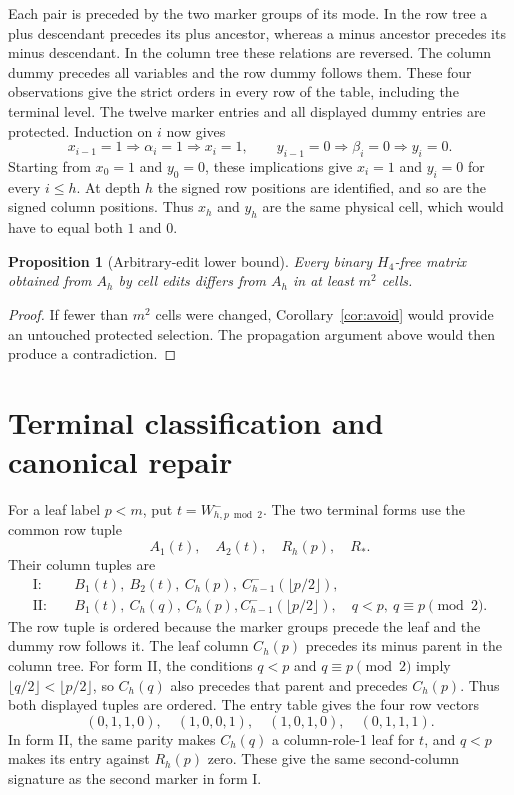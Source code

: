 \documentclass[11pt]{article}
\newtheorem{proposition}[theorem]{Proposition}
\begin{document}
Each pair is preceded by the two marker groups of its mode. In the row
tree a plus descendant precedes its plus ancestor, whereas a minus ancestor
precedes its minus descendant. In the column tree these relations are
reversed. The column dummy precedes all variables and the row dummy follows
them. These four observations give the strict orders in every row of the
table, including the terminal level. The twelve marker entries and all
displayed dummy entries are protected. Induction on $i$
now gives
\[
 x_{i-1}=1\Longrightarrow\alpha_i=1\Longrightarrow x_i=1,
 \qquad
 y_{i-1}=0\Longrightarrow\beta_i=0\Longrightarrow y_i=0.
\]
Starting from $x_0=1$ and $y_0=0$, these implications give $x_i=1$ and
$y_i=0$ for every $i\le h$. At depth $h$ the signed row positions are
identified, and so are the signed column positions. Thus $x_h$ and $y_h$
are the same physical cell, which would have to equal both $1$ and $0$.

\begin{proposition}[Arbitrary-edit lower bound]\label{prop:lower}
Every binary $H_4$-free matrix obtained from $A_h$ by cell edits differs
from $A_h$ in at least $m^2$ cells.
\end{proposition}
\begin{proof}
If fewer than $m^2$ cells were changed, Corollary~\ref{cor:avoid} would
provide an untouched protected selection. The propagation argument above
would then produce a contradiction.
\end{proof}

\section{Terminal classification and canonical repair}\label{sec:classification}
For a leaf label $p<m$, put $t=W^-_{h,p\bmod2}$. The two terminal forms use the common row
tuple
\[
 A_1(t),\quad A_2(t),\quad R_h(p),\quad R_*.
\]
Their column tuples are
\begin{align*}
 \mathrm{I}:\quad&B_1(t),\ B_2(t),\ C_h(p),\ C^-_{h-1}(\lfloor p/2\rfloor),\\
 \mathrm{II}:\quad&B_1(t),\ C_h(q),\ C_h(p),
 C^-_{h-1}(\lfloor p/2\rfloor),
 \quad q<p,\ q\equiv p\pmod2.
\end{align*}
The row tuple is ordered because the marker groups precede the leaf and
the dummy row follows it. The leaf column $C_h(p)$ precedes its minus
parent in the column tree.
For form II, the conditions $q<p$ and $q\equiv p\pmod2$ imply
$\lfloor q/2\rfloor<\lfloor p/2\rfloor$, so $C_h(q)$ also precedes
that parent and precedes $C_h(p)$. Thus both displayed tuples are ordered.
The entry table gives the four row vectors
\[
 (0,1,1,0),\quad(1,0,0,1),\quad(1,0,1,0),\quad(0,1,1,1).
\]
In form II, the same parity makes $C_h(q)$ a column-role-1 leaf for
$t$, and $q<p$ makes its entry against $R_h(p)$ zero. These give
the same second-column signature as the second marker in form I.
\end{document}
